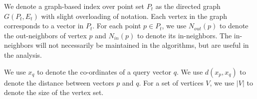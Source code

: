 We denote a graph-based index over point set $P_t$ as the directed graph $G(P_t,E_t)$ with slight overloading of notation.
Each vertex in the graph corresponds to a vector in $P_t$. 
For each point $p\in P_t$, we use $N_{out}(p)$ to denote the out-neighbors of vertex $p$
and $N_{in}(p)$ to denote its in-neighbors.
The in-neighbors will not necessarily be maintained in the algorithms, but are useful in the analysis.

We use $x_q$ to denote the co-ordinates of a query vector $q$.
We use $d(x_p,x_q)$ to denote the distance between vectors $p$ and $q$.
For a set of vertices $V$, we use $|V|$ to denote the size of the vertex set.
